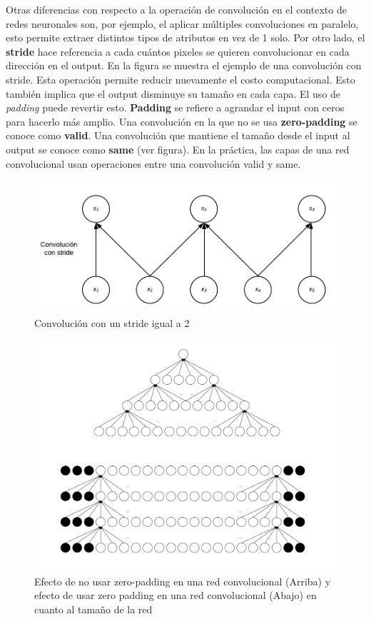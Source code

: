 Otras diferencias con respecto a la operaci\'on de convoluci\'on en el contexto de redes neuronales son, por ejemplo, el aplicar m\'ultiples convoluciones en paralelo, esto permite extraer distintos tipos de atributos en vez de 1 solo. Por otro lado, el \textbf{stride} hace referencia a cada cu\'antos pixeles se quieren convolucionar en cada direcci\'on en el output. En la figura se muestra el ejemplo de una convoluci\'on con stride. Esta operaci\'on permite reducir nuevamente el costo computacional. Esto tambi\'en implica que el output disminuye su tama{\~{n}}o en cada capa. El uso de \textit{padding} puede revertir esto. \textbf{Padding} se refiere a agrandar el input con ceros para hacerlo m\'as amplio. Una convoluci\'on en la que no se usa \textbf{zero-padding} se conoce como \textbf{valid}. Una convoluci\'on que mantiene el tama{\~{n}}o desde el input al output se conoce como \textbf{same} (ver figura). En la pr\'actica, las capas de una red convolucional usan operaciones entre una convoluci\'on valid y same.

\begin{figure}[H]
\captionsetup{font=small,labelfont=small}
\caption{Convoluci\'on con un stride igual a 2}
\centering
\includegraphics[scale=.8]{img/stride.png}
\end{figure}

\begin{figure}[H]
\captionsetup{font=small,labelfont=small}
\caption{Efecto de no usar zero-padding en una red convolucional (Arriba) y efecto de usar zero padding en una red convolucional (Abajo) en cuanto al tama{\~{n}}o de la red}
\centering
\includegraphics[scale=.15]{img/padding.png}
\end{figure}

